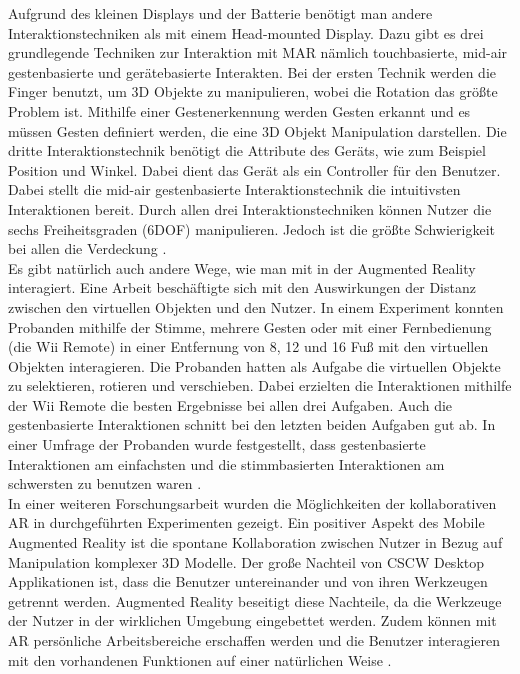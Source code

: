\documentclass[12pt,a4paper, oneside]{scrartcl}
\begin{document}
Aufgrund des kleinen Displays und der Batterie benötigt man andere Interaktionstechniken als mit einem Head-mounted Display. Dazu gibt es drei grundlegende Techniken zur Interaktion mit MAR nämlich touchbasierte, mid-air gestenbasierte und gerätebasierte Interakten. Bei der ersten Technik werden die Finger benutzt, um 3D Objekte zu manipulieren, wobei die Rotation das größte Problem ist. Mithilfe einer Gestenerkennung werden Gesten erkannt und es müssen Gesten definiert werden, die eine 3D Objekt Manipulation darstellen. Die dritte Interaktionstechnik benötigt die Attribute des Geräts, wie zum Beispiel Position und Winkel. Dabei dient das Gerät als ein Controller für den Benutzer. Dabei stellt die mid-air gestenbasierte Interaktionstechnik die intuitivsten Interaktionen bereit. Durch allen drei Interaktionstechniken können Nutzer die sechs Freiheitsgraden (6DOF) manipulieren. Jedoch ist die größte Schwierigkeit bei allen die Verdeckung \cite{goh_sunar_ismail_2019}. \\
Es gibt natürlich auch andere Wege, wie man mit in der Augmented Reality interagiert. Eine Arbeit beschäftigte sich mit den Auswirkungen der Distanz zwischen den virtuellen Objekten und den Nutzer. In einem Experiment konnten Probanden mithilfe der Stimme, mehrere Gesten oder mit einer Fernbedienung (die Wii Remote) in einer Entfernung von 8, 12 und 16 Fuß mit den virtuellen Objekten interagieren. Die Probanden hatten als Aufgabe die virtuellen Objekte zu selektieren, rotieren und verschieben. Dabei erzielten die Interaktionen mithilfe der Wii Remote die besten Ergebnisse bei allen drei Aufgaben. Auch die gestenbasierte Interaktionen schnitt bei den letzten beiden Aufgaben gut ab. In einer Umfrage der Probanden wurde festgestellt, dass gestenbasierte Interaktionen am einfachsten und die stimmbasierten Interaktionen am schwersten zu benutzen waren \cite{whitlock_harnner_brubaker_kane_szafir_2018}. \\
In einer weiteren Forschungsarbeit wurden die Möglichkeiten der kollaborativen AR in durchgeführten Experimenten gezeigt. Ein positiver Aspekt des Mobile Augmented Reality ist die spontane Kollaboration zwischen Nutzer in Bezug auf Manipulation komplexer 3D Modelle. Der große Nachteil von CSCW Desktop Applikationen ist, dass die Benutzer untereinander und von ihren Werkzeugen getrennt werden. Augmented Reality beseitigt diese Nachteile, da die Werkzeuge der Nutzer in der wirklichen Umgebung eingebettet werden. Zudem können mit AR persönliche Arbeitsbereiche erschaffen werden und die Benutzer interagieren mit den vorhandenen Funktionen auf einer natürlichen Weise \cite{reitmayr_schmalstieg}.
\end{document}
